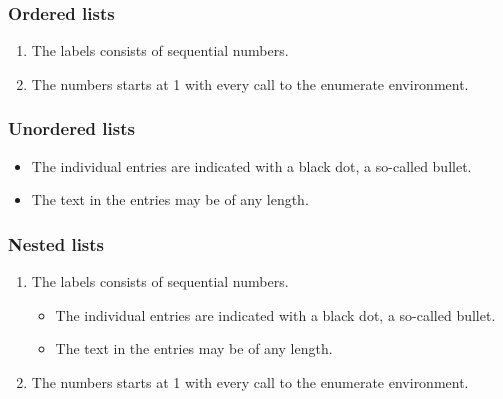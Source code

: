  \subsubsection{Ordered lists} 		%
 \begin{enumerate}
 	\item The labels consists of sequential numbers.
 	\item The numbers starts at 1 with every call to the enumerate environment.
 \end{enumerate}
 \subsubsection{Unordered lists} 		%
 \begin{itemize}
 	\item The individual entries are indicated with a black dot, a so-called bullet.
 	\item The text in the entries may be of any length.
 \end{itemize}
 \subsubsection{Nested lists} 		%
 \begin{enumerate}
 	\item The labels consists of sequential numbers.
 	\begin{itemize}
 		\item The individual entries are indicated with a black dot, a so-called bullet.
 		\item The text in the entries may be of any length.
 	\end{itemize}
 	\item The numbers starts at 1 with every call to the enumerate environment.
 \end{enumerate}
